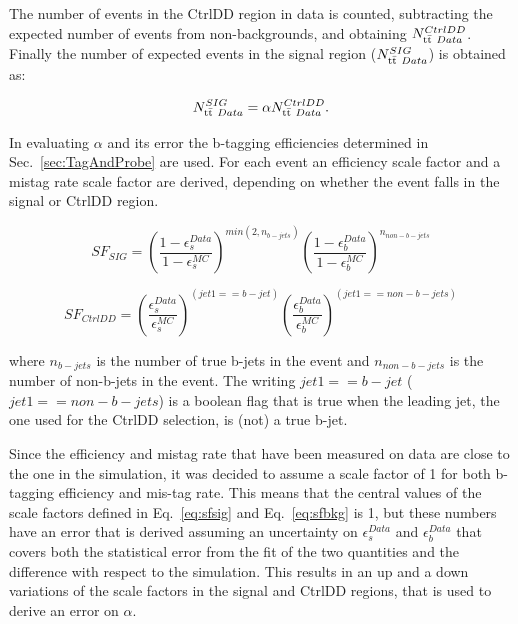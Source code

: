 The number of events in the CtrlDD region in data is counted, subtracting the expected number of events from non-\ttbar backgrounds, and obtaining $N_{\mathrm{t}\bar{\mathrm{t}}~Data}^{CtrlDD}$. Finally the number of expected \ttbar events in the signal region ($N_{\mathrm{t}\bar{\mathrm{t}}~Data}^{SIG}$) is obtained as:

\begin{equation}
N_{\mathrm{t}\bar{\mathrm{t}}~Data}^{SIG} = \alpha{}N_{\mathrm{t}\bar{\mathrm{t}}~Data}^{CtrlDD}.
\end{equation}

In evaluating $\alpha$ and its error the b-tagging efficiencies determined in Sec.~\ref{sec:TagAndProbe} are used. 
For each event an efficiency scale factor and a mistag rate scale factor are derived, depending on whether the event falls in the signal or CtrlDD region.

\begin{equation}
\label{eq:sfsig}
SF_{SIG} = \left(\frac{1-\epsilon_{s}^{Data}}{1-\epsilon_{s}^{MC}}\right)^{min(2, n_{b-jets})} \left(\frac{1-\epsilon_{b}^{Data}}{1-\epsilon_{b}^{MC}}\right)^{n_{non-b-jets}} 
\end{equation}

\begin{equation}
\label{eq:sfbkg}
SF_{CtrlDD} = \left(\frac{\epsilon_{s}^{Data}}{\epsilon_{s}^{MC}}\right)^{(jet1 == b-jet)} \left(\frac{\epsilon_{b}^{Data}}{\epsilon_{b}^{MC}}\right)^{(jet1 == non-b-jets)} 
\end{equation}

where $n_{b-jets}$ is the number of true b-jets in the event and $n_{non-b-jets}$ is the number of non-b-jets in the event. The writing $jet1 == b-jet$ ($jet1 == non-b-jets$) is a boolean flag that is true when the leading jet, the one used for the CtrlDD selection, is (not) a true b-jet.

Since the efficiency and mistag rate that have been measured on data are close to the one in the simulation, it was decided to assume a scale factor of 1 for both b-tagging efficiency and mis-tag rate. This means that the central values of the scale factors defined in Eq.~\ref{eq:sfsig} and Eq.~\ref{eq:sfbkg} is 1, but these numbers have an error that is derived assuming an uncertainty on $\epsilon_{s}^{Data}$ and $\epsilon_{b}^{Data}$ that covers both the statistical error from the fit of the two quantities and the difference with respect to the simulation.
This results in an up and a down variations of the scale factors in the signal and CtrlDD regions, that is used to derive an error on $\alpha$.

